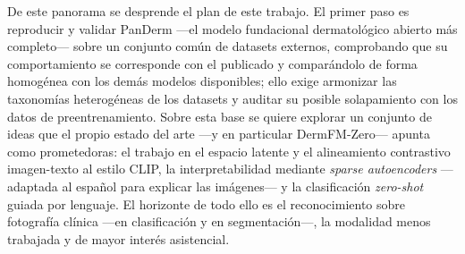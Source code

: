 De este panorama se desprende el plan de este trabajo. El primer paso
es reproducir y validar PanDerm ---el modelo fundacional dermatológico
abierto más completo--- sobre un conjunto común de datasets externos,
comprobando que su comportamiento se corresponde con el publicado y
comparándolo de forma homogénea con los demás modelos disponibles;
ello exige armonizar las taxonomías heterogéneas de los datasets y
auditar su posible solapamiento con los datos de preentrenamiento.
Sobre esta base se quiere explorar un conjunto de ideas
que el propio estado del arte ---y en particular DermFM-Zero--- apunta
como prometedoras: el trabajo en el espacio latente y el alineamiento
contrastivo imagen-texto al estilo CLIP, la interpretabilidad mediante
\emph{sparse autoencoders} ---adaptada al español para explicar las
imágenes--- y la clasificación \emph{zero-shot} guiada por lenguaje.
El horizonte de todo ello es el reconocimiento sobre fotografía
clínica ---en clasificación y en segmentación---, la modalidad menos
trabajada y de mayor interés asistencial.
